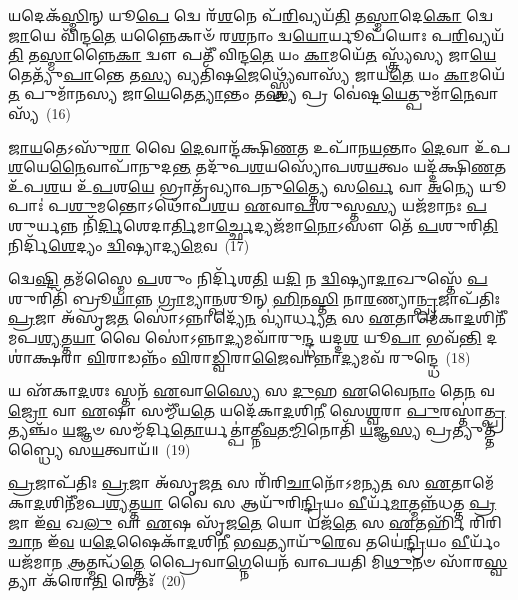 𑌯𑌦𑍇𑌕᳴\-\ul{𑌸𑍍𑌮𑌿}\-𑌨𑍍 𑌯𑍂\-\ul{𑌪𑍇} 𑌦𑍍𑌵𑍇 𑌰᳴\-\ul{𑌶}\-𑌨𑍇 𑌪᳴\-\ul{𑌰𑌿}\-𑌵𑍍𑌯𑌯᳴\-\ul{𑌤𑌿} 𑌤\-\ul{𑌸𑍍𑌮𑌾}\-𑌦𑍇\-\ul{𑌕𑍋} 𑌦𑍍𑌵𑍇 \ul{𑌜𑌾}\-𑌯𑍇 𑌵𑌿᳴𑌨𑍍𑌦\-\ul{𑌤𑍇} 𑌯𑌨𑍍𑌨𑍈𑌕𑌾𑍞᳴ 𑌰\-\ul{𑌶}\-𑌨𑌾𑌂 𑌦𑍍𑌵\-\ul{𑌯𑍋}\-𑌰𑍍𑌯𑍂𑌪᳴𑌯𑍋𑌃 𑌪\-\ul{𑌰𑌿}\-𑌵𑍍𑌯𑌯᳴\-\ul{𑌤𑌿} 𑌤\-\ul{𑌸𑍍𑌮𑌾}\-𑌨𑍍𑌨𑍈\-\ul{𑌕𑌾} 𑌦𑍍𑌵𑍗 𑌪𑌤𑍀᳴ 𑌵𑌿𑌨𑍍𑌦\-\ul{𑌤𑍇} 𑌯𑌂 \ul{𑌕𑌾}\-𑌮𑌯𑍇᳴\-\ul{𑌤} 𑌸𑍍𑌤𑍍𑌰𑍍𑌯᳴𑌸𑍍𑌯 𑌜𑌾\-\ul{𑌯𑍇}\-𑌤𑍇𑌤𑍍𑌯𑍁᳴\-\ul{𑌪𑌾}\-𑌨𑍍𑌤𑍇 𑌤\-\ul{𑌸𑍍𑌯} 𑌵𑍍𑌯𑌤𑌿᳴𑌷\-\ul{𑌜𑍇}\-𑌥𑍍𑌸𑍍𑌤𑍍𑌰𑍍𑌯𑍇᳴𑌵𑌾𑌸𑍍𑌯᳴ 𑌜𑌾𑌯\-\ul{𑌤𑍇} 𑌯𑌂 \ul{𑌕𑌾}\-𑌮𑌯𑍇᳴\-\ul{𑌤} 𑌪𑍁𑌮𑌾᳴𑌨𑌸𑍍𑌯 𑌜𑌾\-\ul{𑌯𑍇}\-𑌤𑍇\-\ul{𑌤𑍍𑌯𑌾}\-𑌨𑍍𑌤𑌂 𑌤\-\ul{𑌸𑍍𑌯} 𑌪𑍍𑌰 𑌵𑍇॑𑌷𑍍𑌟\-\ul{𑌯𑍇}\-𑌤𑍍𑌪𑍁𑌮𑌾᳴\-\ul{𑌨𑍇}\-𑌵𑌾𑌸𑍍𑌯᳴~(16)

\-\ul{𑌜𑌾}\-\-\ul{𑌯}\-𑌤𑍇\-𑌽𑌸𑍁᳴\-\ul{𑌰𑌾} 𑌵𑍈 \ul{𑌦𑍇}\-𑌵𑌾𑌨𑍍𑌦᳴𑌕𑍍𑌷𑌿\-\ul{𑌣}\-𑌤 𑌉𑌪𑌾᳴𑌨\-\ul{𑌯}\-𑌨𑍍𑌤𑌾𑌂 \ul{𑌦𑍇}\-𑌵𑌾 𑌉᳴𑌪\-\ul{𑌶}\-𑌯𑍇\-\ul{𑌨𑍈}\-𑌵𑌾𑌪𑌾᳴𑌨𑍁𑌦\-\ul{𑌨𑍍𑌤} 𑌤𑌦𑍁᳴𑌪\-\ul{𑌶}\-𑌯𑌸𑍍𑌯𑍋᳴𑌪𑌶\-\ul{𑌯}\-𑌤𑍍𑌵𑌂 𑌯𑌦𑍍𑌦᳴𑌕𑍍𑌷𑌿\-\ul{𑌣}\-𑌤 𑌉᳴𑌪\-\ul{𑌶}\-𑌯 𑌉᳴\-\ul{𑌪}\-𑌶\-\ul{𑌯𑍇} 𑌭𑍍𑌰𑌾𑌤𑍃᳴𑌵𑍍𑌯𑌾𑌪𑌨𑍁\-\ul{𑌤𑍍𑌤𑍍𑌯𑍈} 𑌸\-\ul{𑌰𑍍𑌵𑍇} 𑌵𑌾 \ul{𑌅}\-𑌨𑍍𑌯𑍇 𑌯𑍂𑌪𑌾𑌃॑ 𑌪\-\ul{𑌶𑍁}\-𑌮𑌨𑍍𑌤𑍋\-𑌽𑌥𑍋᳴𑌪\-\ul{𑌶}\-𑌯 \ul{𑌏}\-𑌵𑌾\-\ul{𑌪}\-𑌶𑍁𑌸𑍍𑌤\-\ul{𑌸𑍍𑌯} 𑌯𑌜᳴𑌮𑌾𑌨𑌃 \ul{𑌪}\-𑌶𑍁𑌰𑍍𑌯𑌨𑍍𑌨 𑌨𑌿᳴\-\ul{𑌰𑍍𑌦𑌿}\-𑌶𑍇𑌦𑌾\-\ul{𑌰𑍍𑌤𑌿}\-\-𑌮𑌾\-\ul{𑌰𑍍𑌚𑍍𑌛𑍇}\-𑌦𑍍𑌯𑌜᳴𑌮𑌾\-\ul{𑌨𑍋}\-\-𑌽𑌸𑍗 𑌤𑍇᳴ \ul{𑌪}\-𑌶𑍁𑌰𑌿\-\ul{𑌤𑌿} 𑌨𑌿𑌰𑍍𑌦𑌿᳴\-\ul{𑌶𑍇}\-𑌦𑍍𑌯𑌂 \ul{𑌦𑍍𑌵𑌿}\-𑌷𑍍𑌯𑌾𑌦𑍍𑌯\-\ul{𑌮𑍇}\-𑌵~(17)

𑌦𑍍𑌵𑍇\-\ul{𑌷𑍍𑌟𑌿} 𑌤𑌮᳴𑌸𑍍𑌮𑍈 \ul{𑌪}\-𑌶𑍁𑌂 𑌨𑌿𑌰𑍍𑌦𑌿᳴𑌶\-\ul{𑌤𑌿} 𑌯\-\ul{𑌦𑌿} 𑌨 \ul{𑌦𑍍𑌵𑌿}\-𑌷𑍍𑌯𑌾\-\ul{𑌦𑌾}\-𑌖𑍁𑌸𑍍𑌤𑍇᳴ \ul{𑌪}\-𑌶𑍁𑌰𑌿𑌤𑌿᳴ 𑌬𑍍𑌰𑍂\-\ul{𑌯𑌾}\-𑌨𑍍𑌨 \ul{𑌗𑍍𑌰𑌾}\-𑌮𑍍𑌯𑌾\-\ul{𑌨𑍍𑌪}\-𑌶𑍂𑌨𑍍 \ul{𑌹𑌿}\-𑌨\-\ul{𑌸𑍍𑌤𑌿} 𑌨𑌾\-\ul{𑌰}\-𑌣𑍍𑌯𑌾\-\ul{𑌨𑍍𑌪𑍍𑌰}\-𑌜𑌾𑌪᳴𑌤𑌿𑌃 \ul{𑌪𑍍𑌰}\-𑌜𑌾 𑌅᳴𑌸𑍃𑌜\-\ul{𑌤} 𑌸𑍋॑\-𑌽𑌨𑍍𑌨𑌾𑌦𑍍𑌯𑍇᳴\-\ul{𑌨} 𑌵𑍍𑌯𑌾॑𑌰𑍍𑌧𑍍𑌯\-\ul{𑌤} 𑌸 \ul{𑌏}\-𑌤𑌾𑌮𑍇᳴𑌕𑌾\-\ul{𑌦}\-𑌶𑌿𑌨𑍀᳴𑌮𑌪\-\ul{𑌶𑍍𑌯}\-𑌤𑍍𑌤\-\ul{𑌯𑌾} 𑌵𑍈 𑌸𑍋॑\-𑌽𑌨𑍍𑌨𑌾\-\ul{𑌦𑍍𑌯}\-𑌮𑌵𑌾᳴𑌰𑍁\-\ul{𑌨𑍍𑌦𑍍𑌧} 𑌯𑌦𑍍𑌦\-\ul{𑌶} 𑌯𑍂\-\ul{𑌪𑌾} 𑌭𑌵᳴\-\ul{𑌨𑍍𑌤𑌿} 𑌦𑌶𑌾॑𑌕𑍍𑌷𑌰𑌾 \ul{𑌵𑌿}\-𑌰𑌾𑌡𑌨𑍍𑌨𑌂᳴ \ul{𑌵𑌿}\-𑌰𑌾\-\ul{𑌡𑍍𑌵𑌿}\-𑌰𑌾\-\ul{𑌜𑍈}\-𑌵𑌾𑌨𑍍𑌨𑌾\-\ul{𑌦𑍍𑌯}\-𑌮𑌵᳴ 𑌰𑍁𑌨𑍍𑌦𑍍𑌧𑍇~(18)

𑌯 𑌏᳴𑌕𑌾\-\ul{𑌦}\-𑌶𑌃 𑌸𑍍𑌤𑌨᳴ \ul{𑌏}\-𑌵𑌾\-\ul{𑌸𑍍𑌯𑍈} 𑌸 \ul{𑌦𑍁}\-𑌹 \ul{𑌏}\-𑌵𑍈\-\ul{𑌨𑌾𑌂} 𑌤𑍇\-\ul{𑌨} 𑌵\-\ul{𑌜𑍍𑌰𑍋} 𑌵𑌾 \ul{𑌏}\-𑌷𑌾 𑌸𑌮𑍍𑌮𑍀᳴𑌯\-\ul{𑌤𑍇} 𑌯𑌦𑍇᳴𑌕𑌾\-\ul{𑌦}\-𑌶𑌿\-\ul{𑌨𑍀} 𑌸𑍇\-\ul{𑌶𑍍𑌵}\-𑌰𑌾 \ul{𑌪𑍁}\-𑌰𑌸𑍍𑌤𑌾॑\-\ul{𑌤𑍍𑌪𑍍𑌰}\-𑌤𑍍𑌯𑌞𑍍𑌚𑌂᳴ \ul{𑌯}\-𑌜𑍍𑌞𑍞 𑌸𑌮𑍍𑌮᳴𑌰𑍍𑌦𑌿\-\ul{𑌤𑍋}\-𑌰𑍍𑌯𑌤𑍍𑌪𑌾॑𑌤𑍍𑌨𑍀\-\ul{𑌵}\-𑌤\-\ul{𑌮𑍍𑌮𑌿}\-𑌨𑍋𑌤𑌿᳴ \ul{𑌯}\-𑌜𑍍𑌞\-\ul{𑌸𑍍𑌯} 𑌪𑍍𑌰𑌤𑍍𑌯𑍁𑌤𑍍𑌤᳴𑌬𑍍𑌧𑍍𑌯𑍈 𑌸\-\ul{𑌯}\-𑌤𑍍𑌵𑌾𑌯᳴॥~(19)

{\anuvakamend[{𑌵𑍈 𑌸𑌮᳴\-\ul{𑌷𑍍𑌟𑍍𑌯𑍈} 𑌪𑍁𑌮𑌾᳴\-\ul{𑌨𑍇}\-𑌵𑌾\-\ul{𑌸𑍍𑌯} 𑌯\-\ul{𑌮𑍇}\-𑌵 𑌰𑍁᳴𑌨𑍍𑌧𑍇 \ul{𑌤𑍍𑌰𑌿}\-\-\ul{𑍞}\-𑌶𑌚𑍍𑌚᳴}]}%

\-\ul{𑌪𑍍𑌰}\-𑌜𑌾𑌪᳴𑌤𑌿𑌃 \ul{𑌪𑍍𑌰}\-𑌜𑌾 𑌅᳴𑌸𑍃𑌜\-\ul{𑌤} 𑌸 𑌰𑌿᳴𑌰𑌿\-\ul{𑌚𑌾}\-𑌨𑍋᳴\-𑌽𑌮𑌨𑍍𑌯\-\ul{𑌤} 𑌸 \ul{𑌏}\-𑌤𑌾𑌮𑍇᳴𑌕𑌾\-\ul{𑌦}\-𑌶𑌿𑌨𑍀᳴𑌮𑌪\-\ul{𑌶𑍍𑌯}\-𑌤𑍍𑌤\-\ul{𑌯𑌾} 𑌵𑍈 𑌸 𑌆𑌯𑍁᳴𑌰𑌿\-\ul{𑌨𑍍𑌦𑍍𑌰𑌿}\-𑌯𑌂 \ul{𑌵𑍀}\-𑌰𑍍𑌯᳴\-\ul{𑌮𑌾}\-𑌤𑍍𑌮𑌨𑍍𑌨᳴𑌧𑌤𑍍𑌤 \ul{𑌪𑍍𑌰}\-𑌜𑌾 𑌇᳴\-\ul{𑌵} 𑌖\-\ul{𑌲𑍁} 𑌵𑌾 \ul{𑌏}\-𑌷 𑌸𑍃᳴𑌜\-\ul{𑌤𑍇} 𑌯𑍋 𑌯𑌜᳴\-\ul{𑌤𑍇} 𑌸 \ul{𑌏}\-𑌤𑌰𑍍\mbox{}𑌹𑌿᳴ 𑌰𑌿𑌰𑌿\-\ul{𑌚𑌾}\-𑌨 𑌇᳴\-\ul{𑌵} 𑌯\-\ul{𑌦𑍇}\-𑌷𑍈𑌕𑌾᳴\-\ul{𑌦}\-𑌶𑌿\-\ul{𑌨𑍀} 𑌭\-\ul{𑌵}\-𑌤𑍍𑌯𑌾𑌯𑍁᳴\-\ul{𑌰𑍇}\-𑌵 𑌤𑌯𑍇॑\-\ul{𑌨𑍍𑌦𑍍𑌰𑌿}\-𑌯𑌂 \ul{𑌵𑍀}\-𑌰𑍍𑌯𑌂᳴ 𑌯𑌜᳴𑌮𑌾𑌨 \ul{𑌆}\-𑌤𑍍𑌮𑌨𑍍𑌧᳴\-\ul{𑌤𑍍𑌤𑍇} 𑌪𑍍𑌰𑍈𑌵𑌾\-\ul{𑌗𑍍𑌨𑍇}\-𑌯𑍇𑌨᳴ 𑌵𑌾𑌪𑌯𑌤𑌿 𑌮𑌿\-\ul{𑌥𑍁}\-𑌨𑍞 𑌸𑌾᳴𑌰\-\ul{𑌸𑍍𑌵}\-𑌤𑍍𑌯𑌾 𑌕᳴𑌰𑍋\-\ul{𑌤𑌿} 𑌰𑍇𑌤𑌃᳴~(20)


